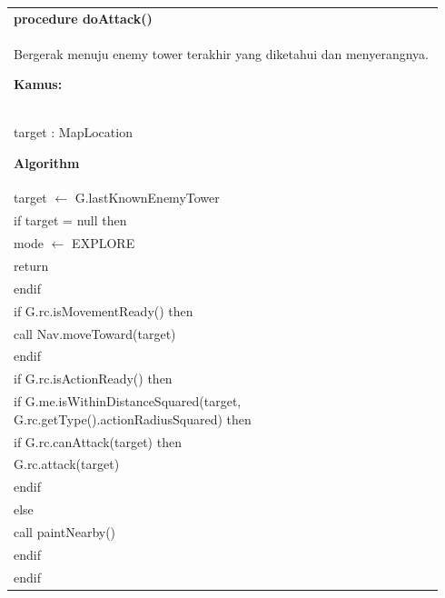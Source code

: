 \documentclass{article}
\newenvironment{pseudobox}
{
\centering
\begin{longtable}{|p{0.94\linewidth}|}
\hline
}
{
\\ \hline
\end{longtable}
\vspace{0.05cm}
}
\begin{document}
\begin{pseudobox}
\textbf{procedure doAttack()} \\
{ Bergerak menuju enemy tower terakhir yang diketahui dan menyerangnya. }

\textbf{Kamus:} \\
\hspace*{1em} target : MapLocation

\textbf{Algorithm} \\
\hspace*{1em} target $\leftarrow$ G.lastKnownEnemyTower \\

\hspace*{1em} if target = null then \\
\hspace*{2em} mode $\leftarrow$ EXPLORE \\
\hspace*{2em} return \\
\hspace*{1em} endif \\

\hspace*{1em} if G.rc.isMovementReady() then \\
\hspace*{2em} call Nav.moveToward(target) \\
\hspace*{1em} endif \\

\hspace*{1em} if G.rc.isActionReady() then \\
\hspace*{2em} if G.me.isWithinDistanceSquared(target, G.rc.getType().actionRadiusSquared) then \\
\hspace*{3em} if G.rc.canAttack(target) then \\
\hspace*{4em} G.rc.attack(target) \\
\hspace*{3em} endif \\
\hspace*{2em} else \\
\hspace*{3em} call paintNearby() \\
\hspace*{2em} endif \\
\hspace*{1em} endif
\end{pseudobox}
\end{document}

